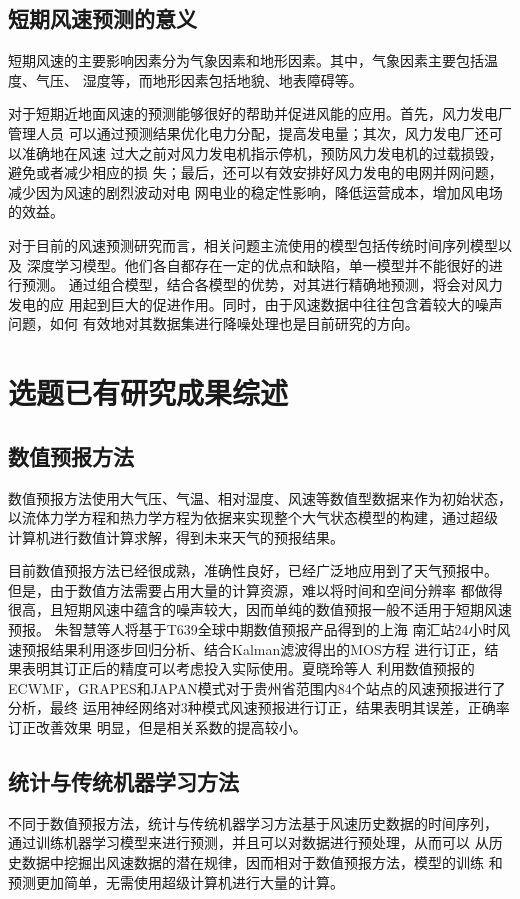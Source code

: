 \documentclass[AutoFakeBold]{LZUThesis}
\begin{document}
\subsection{短期风速预测的意义}
短期风速的主要影响因素分为气象因素和地形因素。其中，气象因素主要包括温度、气压、
湿度等，而地形因素包括地貌、地表障碍等。

对于短期近地面风速的预测能够很好的帮助并促进风能的应用。首先，风力发电厂管理人员
可以通过预测结果优化电力分配，提高发电量；其次，风力发电厂还可以准确地在风速
过大之前对风力发电机指示停机，预防风力发电机的过载损毁，避免或者减少相应的损
失；最后，还可以有效安排好风力发电的电网并网问题，减少因为风速的剧烈波动对电
网电业的稳定性影响，降低运营成本，增加风电场的效益。

对于目前的风速预测研究而言，相关问题主流使用的模型包括传统时间序列模型以及
深度学习模型。他们各自都存在一定的优点和缺陷，单一模型并不能很好的进行预测。
通过组合模型，结合各模型的优势，对其进行精确地预测，将会对风力发电的应
用起到巨大的促进作用。同时，由于风速数据中往往包含着较大的噪声问题，如何
有效地对其数据集进行降噪处理也是目前研究的方向。

\section{选题已有研究成果综述}
\subsection{数值预报方法}
数值预报方法使用大气压、气温、相对湿度、风速等数值型数据来作为初始状态，
以流体力学方程和热力学方程为依据来实现整个大气状态模型的构建，通过超级
计算机进行数值计算求解，得到未来天气的预报结果。

目前数值预报方法已经很成熟，准确性良好，已经广泛地应用到了天气预报中。
但是，由于数值方法需要占用大量的计算资源，难以将时间和空间分辨率
都做得很高，且短期风速中蕴含的噪声较大，因而单纯的数值预报一般不适用于短期风速预报。
朱智慧等人将基于T639全球中期数值预报产品得到的上海
南汇站24小时风速预报结果利用逐步回归分析、结合Kalman滤波得出的MOS方程
进行订正，结果表明其订正后的精度可以考虑投入实际使用。夏晓玲等人
利用数值预报的
ECWMF，GRAPES和JAPAN模式对于贵州省范围内84个站点的风速预报进行了分析，最终
运用神经网络对3种模式风速预报进行订正，结果表明其误差，正确率订正改善效果
明显，但是相关系数的提高较小。

\subsection{统计与传统机器学习方法}
不同于数值预报方法，统计与传统机器学习方法基于风速历史数据的时间序列，
通过训练机器学习模型来进行预测，并且可以对数据进行预处理，从而可以
从历史数据中挖掘出风速数据的潜在规律，因而相对于数值预报方法，模型的训练
和预测更加简单，无需使用超级计算机进行大量的计算。
\end{document}
